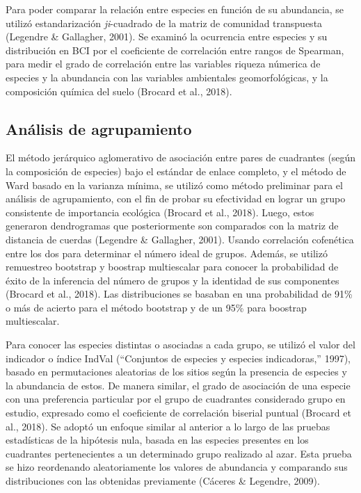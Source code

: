 \documentclass[11pt,]{article}
\begin{document}
Para poder comparar la relación entre especies en función de su
abundancia, se utilizó estandarización \emph{ji}-cuadrado de la matriz
de comunidad transpuesta (Legendre \& Gallagher, 2001). Se examinó la
ocurrencia entre especies y su distribución en BCI por el coeficiente de
correlación entre rangos de Spearman, para medir el grado de correlación
entre las variables riqueza númerica de especies y la abundancia con las
variables ambientales geomorfológicas, y la composición química del
suelo (Brocard et al., 2018).

\subsection{Análisis de agrupamiento}\label{anuxe1lisis-de-agrupamiento}

El método jerárquico aglomerativo de asociación entre pares de
cuadrantes (según la composición de especies) bajo el estándar de enlace
completo, y el método de Ward basado en la varianza mínima, se utilizó
como método preliminar para el análisis de agrupamiento, con el fin de
probar su efectividad en lograr un grupo consistente de importancia
ecológica (Brocard et al., 2018). Luego, estos generaron dendrogramas
que posteriormente son comparados con la matriz de distancia de cuerdas
(Legendre \& Gallagher, 2001). Usando correlación cofenética entre los
dos para determinar el número ideal de grupos. Además, se utilizó
remuestreo bootstrap y boostrap multiescalar para conocer la
probabilidad de éxito de la inferencia del número de grupos y la
identidad de sus componentes (Brocard et al., 2018). Las distribuciones
se basaban en una probabilidad de 91\% o más de acierto para el método
bootstrap y de un 95\% para boostrap multiescalar.

Para conocer las especies distintas o asociadas a cada grupo, se utilizó
el valor del indicador o índice IndVal (``Conjuntos de especies y
especies indicadoras,'' 1997), basado en permutaciones aleatorias de los
sitios según la presencia de especies y la abundancia de estos. De
manera similar, el grado de asociación de una especie con una
preferencia particular por el grupo de cuadrantes considerado grupo en
estudio, expresado como el coeficiente de correlación biserial puntual
(Brocard et al., 2018). Se adoptó un enfoque similar al anterior a lo
largo de las pruebas estadísticas de la hipótesis nula, basada en las
especies presentes en los cuadrantes pertenecientes a un determinado
grupo realizado al azar. Esta prueba se hizo reordenando aleatoriamente
los valores de abundancia y comparando sus distribuciones con las
obtenidas previamente (Cáceres \& Legendre, 2009).
\end{document}
